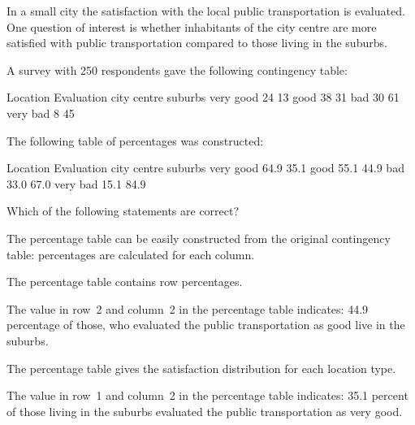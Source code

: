 
\begin{question}
  In a small city the satisfaction with the local public
  transportation is evaluated. One question of interest is whether
  inhabitants of the city centre are more satisfied with public
  transportation compared to those living in the suburbs.

  A survey with 250 respondents gave the following contingency table:
\begin{Schunk}
\begin{Soutput}
           Location
Evaluation  city centre suburbs
  very good          24      13
  good               38      31
  bad                30      61
  very bad            8      45
\end{Soutput}
\end{Schunk}

The following table of percentages was constructed:
\begin{Schunk}
\begin{Soutput}
           Location
Evaluation  city centre suburbs    
  very good        64.9        35.1
  good             55.1        44.9
  bad              33.0        67.0
  very bad         15.1        84.9
\end{Soutput}
\end{Schunk}

Which of the following statements are correct?

\begin{answerlist}
  \item The percentage table can be easily constructed from the original contingency table: percentages are calculated for each column.
  \item The percentage table contains  row percentages.
  \item The value in row~2 and column~2 in the percentage table indicates: 44.9 percentage of those, who evaluated the public transportation as good live in the suburbs.
  \item The percentage table gives the satisfaction distribution for each location type.
  \item The value in row~1 and column~2 in the percentage table indicates: 35.1 percent of those living in the suburbs evaluated the public transportation  as very good.
\end{answerlist}
\end{question}

